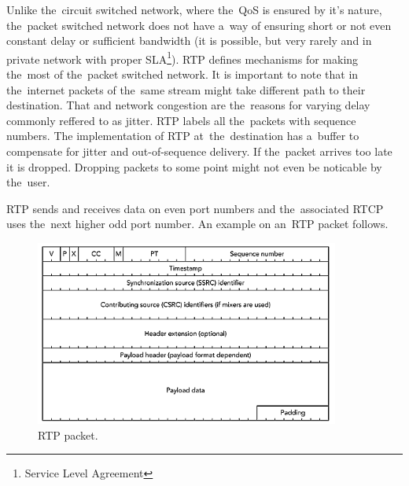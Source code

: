Unlike the~circuit switched network, where the~QoS is ensured by it's nature, the~packet switched network does not have a~way of ensuring short or not even constant delay or sufficient bandwidth (it is possible, but very rarely and in private network with proper SLA\footnote{Service Level Agreement}). RTP defines mechanisms for making the~most of the~packet switched network. It is important to note that in the~internet packets of the~same stream might take different path to their destination. That and network congestion are the~reasons for varying delay commonly reffered to as jitter. RTP labels all the~packets with sequence numbers. The implementation of RTP at~the~destination has a~buffer to compensate for jitter and out-of-sequence delivery. If the~packet arrives too late it is dropped. Dropping packets to some point might not even be noticable by the~user. 

RTP sends and receives data on even port numbers and the~associated RTCP uses the~next higher odd port number. An example on an~RTP packet follows. 

\begin{figure}[ht]
	\begin{center}
	\includegraphics[width=10cm]{fig/rtp-packet.png}
	\caption{RTP packet.\cite{rtpBook}}
	\label{fig:rtpPacket}
\end{center}
\end{figure}


